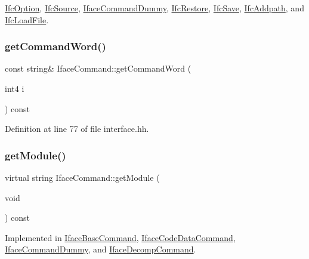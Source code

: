\mbox{\hyperlink{class_ifc_option_a2337595063d7701739837999034ac8bf}{Ifc\+Option}}, \mbox{\hyperlink{class_ifc_source_a53da0f4768e86d92bea07dc05b4a878f}{Ifc\+Source}}, \mbox{\hyperlink{class_iface_command_dummy_acac62af3353e7afe18ca6fd05b0d75fa}{Iface\+Command\+Dummy}}, \mbox{\hyperlink{class_ifc_restore_a19a9d5482d3aee44b2e0f548d69a12c4}{Ifc\+Restore}}, \mbox{\hyperlink{class_ifc_save_a56ac19bca1d3b3cff186db25db549a6d}{Ifc\+Save}}, \mbox{\hyperlink{class_ifc_addpath_abe711b93972455d4790fc6649cf67675}{Ifc\+Addpath}}, and \mbox{\hyperlink{class_ifc_load_file_af7ea7408b40db6c11eff2a4f99f4ef80}{Ifc\+Load\+File}}.

\mbox{\label{class_iface_command_a76d8a2f37203ae55e9c26d73c5ede829}} 
\subsubsection{\texorpdfstring{getCommandWord()}{getCommandWord()}}
{\footnotesize\ttfamily const string\& Iface\+Command\+::get\+Command\+Word (\begin{DoxyParamCaption}\item[{int4}]{i }\end{DoxyParamCaption}) const\hspace{0.3cm}{\ttfamily [inline]}}



Definition at line 77 of file interface.\+hh.

\mbox{\label{class_iface_command_a06f9500f4b0a0e3cf14010cf133502d5}} 
\subsubsection{\texorpdfstring{getModule()}{getModule()}}
{\footnotesize\ttfamily virtual string Iface\+Command\+::get\+Module (\begin{DoxyParamCaption}\item[{void}]{ }\end{DoxyParamCaption}) const\hspace{0.3cm}{\ttfamily [pure virtual]}}



Implemented in \mbox{\hyperlink{class_iface_base_command_add0c9e33b2e1a56b04caab6aaea343dd}{Iface\+Base\+Command}}, \mbox{\hyperlink{class_iface_code_data_command_abfa633dd19e5672b125425a9541c94d3}{Iface\+Code\+Data\+Command}}, \mbox{\hyperlink{class_iface_command_dummy_ae7284da5e8726825621896c967b2d295}{Iface\+Command\+Dummy}}, and \mbox{\hyperlink{class_iface_decomp_command_aa1505dc6014dbdca5f922a826cd04b40}{Iface\+Decomp\+Command}}.

